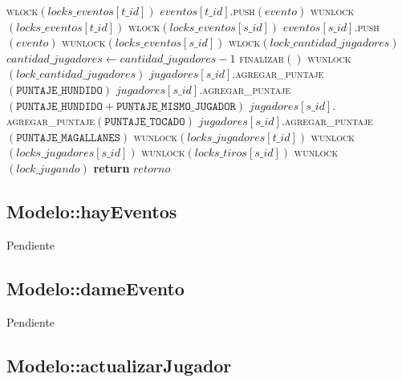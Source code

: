 \documentclass[a4paper,10pt,twoside]{article}
\newenvironment{pseudo}[1][]{%
    \vspace{0.5em}%
    \begin{algorithmic}%
}
{%
    \end{algorithmic}%
    \vspace{0.5em}%
}
\newcommand{\Fn}[2]{\textsc{#1}$(#2)$}
\newcommand{\PReturn}[1]{\textbf{return} $#1$}
\begin{document}
\begin{pseudo}
                \State
                \State \Fn{wlock}{locks\_eventos[t\_id]} 
                \State $eventos[t\_id].$\Fn{push}{evento}
                \State \Fn{wunlock}{locks\_eventos[t\_id]}
                \State
                \State \Fn{wlock}{locks\_eventos[s\_id]} 
                \State $eventos[s\_id].$\Fn{push}{evento}
                \State \Fn{wunlock}{locks\_eventos[s\_id]}
                \State
                    \State \Fn{wlock}{lock\_cantidad\_jugadores}
                    \State $cantidad\_jugadores \leftarrow cantidad\_jugadores - 1$
                        \State \Fn{finalizar}{}
                    \EndIf
                    \State \Fn{wunlock}{lock\_cantidad\_jugadores}
                \EndIf
            \EndIf
                \State $jugadores[s\_id].$\Fn{agregar\_puntaje}{\texttt{PUNTAJE\_HUNDIDO}}
                \State $jugadores[s\_id].$\Fn{agregar\_puntaje}{\texttt{PUNTAJE\_HUNDIDO} + \texttt{PUNTAJE\_MISMO\_JUGADOR}}
                \State $jugadores[s\_id].$\Fn{agregar\_puntaje}{\texttt{PUNTAJE\_TOCADO}}
                \State $jugadores[s\_id].$\Fn{agregar\_puntaje}{\texttt{PUNTAJE\_MAGALLANES}}
            \EndIf
            \State
            \State \Fn{wunlock}{locks\_jugadores[t\_id]}
            \State \Fn{wunlock}{locks\_jugadores[s\_id]}
        \EndIf
        \State
        \State \Fn{wunlock}{locks\_tiros[s\_id]}
        \State \Fn{wunlock}{lock\_jugando}
        \State
        \State \PReturn{retorno}
    \EndProcedure
\end{pseudo}


\subsection{Modelo::hayEventos}

Pendiente


\subsection{Modelo::dameEvento}

Pendiente


\subsection{Modelo::actualizarJugador}
\end{document}

